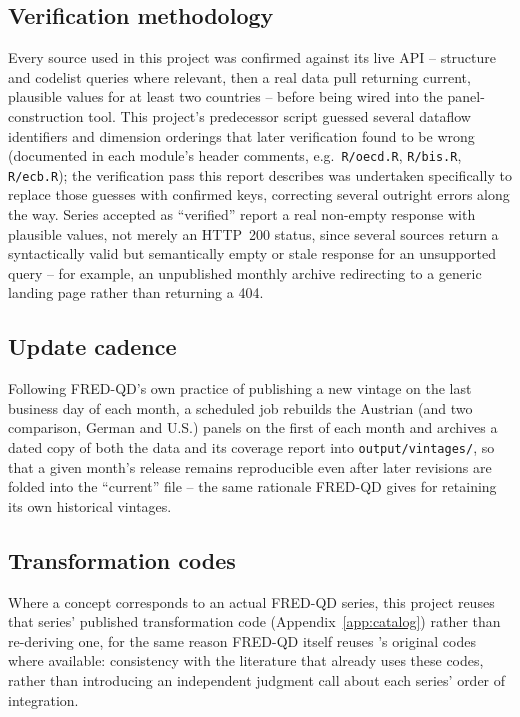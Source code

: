\documentclass[11pt]{article}
\begin{document}
\subsection{Verification methodology}

Every source used in this project was confirmed against its live API --
structure and codelist queries where relevant, then a real data pull
returning current, plausible values for at least two countries -- before
being wired into the panel-construction tool. This project's predecessor
script guessed several dataflow identifiers and dimension orderings that
later verification found to be wrong (documented in each module's header
comments, e.g.\ \texttt{R/oecd.R}, \texttt{R/bis.R}, \texttt{R/ecb.R}); the
verification pass this report describes was undertaken specifically to
replace those guesses with confirmed keys, correcting several outright
errors along the way. Series accepted as ``verified'' report a real
non-empty response with plausible values, not merely an HTTP~200 status,
since several sources return a syntactically valid but semantically empty
or stale response for an unsupported query -- for example, an unpublished
monthly archive redirecting to a generic landing page rather than
returning a 404.

\subsection{Update cadence}

Following FRED-QD's own practice of publishing a new vintage on the last
business day of each month, a scheduled job rebuilds the Austrian (and two
comparison, German and U.S.) panels on the first of each month and
archives a dated copy of both the data and its coverage report into
\texttt{output/vintages/}, so that a given month's release remains
reproducible even after later revisions are folded into the ``current''
file -- the same rationale FRED-QD gives for retaining its own historical
vintages.

\subsection{Transformation codes}

Where a concept corresponds to an actual FRED-QD series, this project
reuses that series' published transformation code (Appendix~\ref{app:catalog})
rather than re-deriving one, for the same reason FRED-QD itself reuses
\citet{stockwatson2012disentangling}'s original codes where available:
consistency with the literature that already uses these codes, rather than
introducing an independent judgment call about each series' order of
integration.
\end{document}
